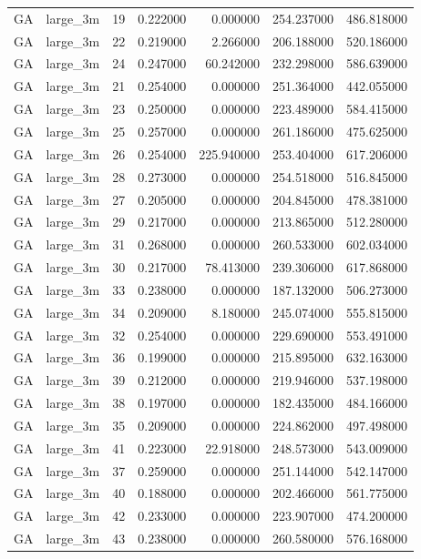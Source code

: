 \begin{tabular}{llrrrrr}
GA & large_3m & 19 & 0.222000 & 0.000000 & 254.237000 & 486.818000 \\
GA & large_3m & 22 & 0.219000 & 2.266000 & 206.188000 & 520.186000 \\
GA & large_3m & 24 & 0.247000 & 60.242000 & 232.298000 & 586.639000 \\
GA & large_3m & 21 & 0.254000 & 0.000000 & 251.364000 & 442.055000 \\
GA & large_3m & 23 & 0.250000 & 0.000000 & 223.489000 & 584.415000 \\
GA & large_3m & 25 & 0.257000 & 0.000000 & 261.186000 & 475.625000 \\
GA & large_3m & 26 & 0.254000 & 225.940000 & 253.404000 & 617.206000 \\
GA & large_3m & 28 & 0.273000 & 0.000000 & 254.518000 & 516.845000 \\
GA & large_3m & 27 & 0.205000 & 0.000000 & 204.845000 & 478.381000 \\
GA & large_3m & 29 & 0.217000 & 0.000000 & 213.865000 & 512.280000 \\
GA & large_3m & 31 & 0.268000 & 0.000000 & 260.533000 & 602.034000 \\
GA & large_3m & 30 & 0.217000 & 78.413000 & 239.306000 & 617.868000 \\
GA & large_3m & 33 & 0.238000 & 0.000000 & 187.132000 & 506.273000 \\
GA & large_3m & 34 & 0.209000 & 8.180000 & 245.074000 & 555.815000 \\
GA & large_3m & 32 & 0.254000 & 0.000000 & 229.690000 & 553.491000 \\
GA & large_3m & 36 & 0.199000 & 0.000000 & 215.895000 & 632.163000 \\
GA & large_3m & 39 & 0.212000 & 0.000000 & 219.946000 & 537.198000 \\
GA & large_3m & 38 & 0.197000 & 0.000000 & 182.435000 & 484.166000 \\
GA & large_3m & 35 & 0.209000 & 0.000000 & 224.862000 & 497.498000 \\
GA & large_3m & 41 & 0.223000 & 22.918000 & 248.573000 & 543.009000 \\
GA & large_3m & 37 & 0.259000 & 0.000000 & 251.144000 & 542.147000 \\
GA & large_3m & 40 & 0.188000 & 0.000000 & 202.466000 & 561.775000 \\
GA & large_3m & 42 & 0.233000 & 0.000000 & 223.907000 & 474.200000 \\
GA & large_3m & 43 & 0.238000 & 0.000000 & 260.580000 & 576.168000 \\

\end{tabular}
